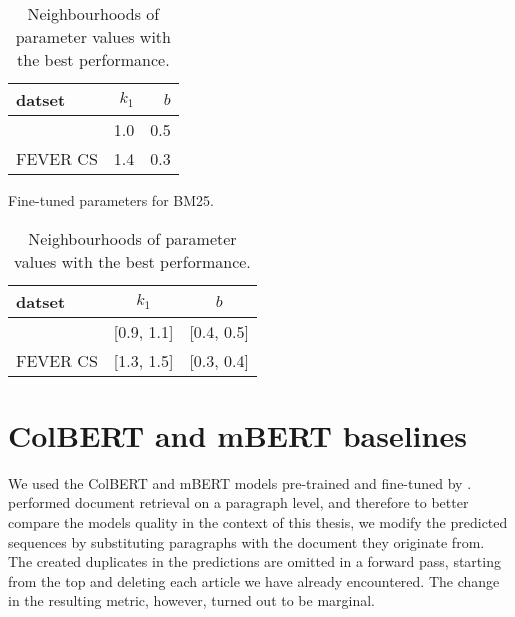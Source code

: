 \begin{table}[!htb]
    \centering
    \begin{minipage}[t]{.47\textwidth}    
        \centering
        \begin{tabular}{lrr}
            datset & $k_1$ & $b$ \\
            \midrule
            \CTK{} & 1.0 & 0.5 \\
            FEVER CS & 1.4 & 0.3
        \end{tabular}
        \caption[BM25 Fine-tuned Parameters]{Fine-tuned parameters for BM25.}
        \label{tab:bm25_finetune}
    \end{minipage}
    \hfill
    \begin{minipage}[t]{.47\textwidth}
        \centering
        \begin{tabular}{lcc}
            datset & $k_1$ & $b$ \\
            \midrule
            \CTK{} & [0.9, 1.1] & [0.4, 0.5] \\
            FEVER CS & [1.3, 1.5] & [0.3, 0.4]
        \end{tabular}
        \caption[BM25 Promising Parameter Sets]{Neighbourhoods of parameter values with the best performance.}
        \label{tab:bm25_sets}
    \end{minipage}
\end{table}

\section{ColBERT and mBERT baselines}

We used the ColBERT and mBERT models pre-trained and fine-tuned by \citet{rypar}.
\citet{rypar} performed document retrieval on a paragraph level, and therefore to better compare the models quality in the context of this thesis, we modify the predicted sequences by substituting paragraphs with the document they originate from.
The created duplicates in the predictions are omitted in a forward pass, starting from the top and deleting each article we have already encountered.
The change in the resulting metric, however, turned out to be marginal.

